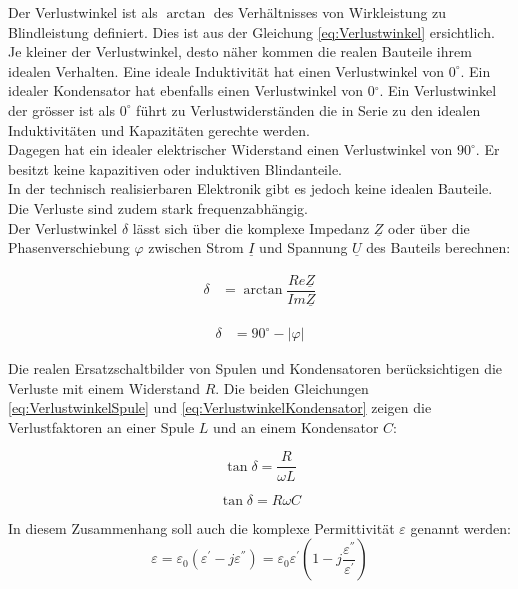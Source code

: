 Der Verlustwinkel ist als $\arctan$ des Verhältnisses von Wirkleistung zu Blindleistung definiert. Dies ist  aus der Gleichung  \ref{eq:Verlustwinkel} ersichtlich. 
Je kleiner der Verlustwinkel, desto näher kommen die realen Bauteile ihrem idealen Verhalten. Eine ideale Induktivität hat einen Verlustwinkel von $0^\circ$. Ein idealer Kondensator hat ebenfalls einen Verlustwinkel von 0$^\circ$. Ein Verlustwinkel der grösser ist als $0^\circ$ führt zu Verlustwiderständen die in Serie zu den idealen Induktivitäten und Kapazitäten gerechte werden.\\
Dagegen hat ein idealer elektrischer Widerstand  einen Verlustwinkel von $90^\circ$. Er besitzt keine kapazitiven oder induktiven Blindanteile.\\
In der technisch realisierbaren Elektronik gibt es jedoch keine idealen Bauteile. Die Verluste sind zudem stark frequenzabhängig.\\
Der Verlustwinkel  $\delta$  lässt sich über die komplexe Impedanz $\underline{Z}$ oder über die Phasenverschiebung  $\varphi$  zwischen Strom $\underline{I}$ und Spannung $\underline{U}$ des Bauteils berechnen: 


\label{eq:Verlustwinkel}
\begin{align}
\delta &= \arctan \dfrac{Re\underline{Z}}{Im\underline{Z}}
\end{align}

\label{eq:Verlustwinkel_aus_Phi}
\begin{align}
\delta &= 90^\circ - |\varphi|
\end{align}

Die realen Ersatzschaltbilder von Spulen und Kondensatoren berücksichtigen die Verluste mit einem Widerstand $R$.
Die beiden Gleichungen \ref{eq:VerlustwinkelSpule} und \ref{eq:VerlustwinkelKondensator} zeigen die Verlustfaktoren an einer Spule $L$ und an einem Kondensator $C$:

\begin{equation}\label{eq:VerlustwinkelSpule}
\tan \delta = \dfrac{R}{\omega L}
\end{equation}

\begin{equation} \label{eq:VerlustwinkelKondensator}
\tan \delta = R \omega C
\end{equation}

In diesem Zusammenhang soll auch die komplexe Permittivität $\varepsilon$ genannt werden:
\begin{equation} \label{eq:komplexePermitivität}
\varepsilon=\varepsilon_0(\varepsilon^{'}-j\varepsilon^{''})=\varepsilon_0\varepsilon^{'}(1-j\dfrac{\varepsilon^{''}}{\varepsilon^{'}})
\end{equation}

